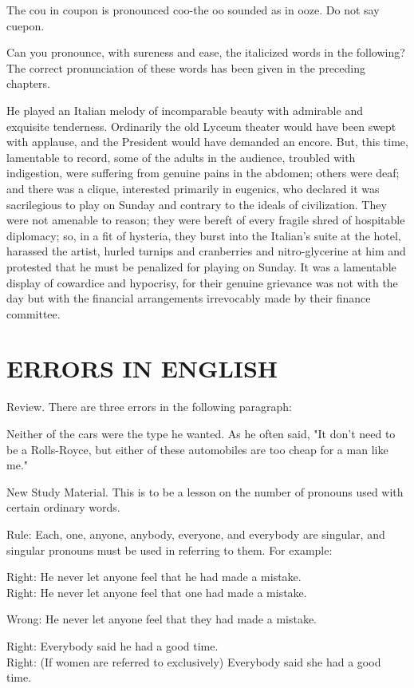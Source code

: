 \documentclass[10pt]{article}
\begin{document}
The cou in coupon is pronounced coo-the oo sounded as in ooze. Do not say cuepon.

Can you pronounce, with sureness and ease, the italicized words in the following? The correct pronunciation of these words has been given in the preceding chapters.

He played an Italian melody of incomparable beauty with admirable and exquisite tenderness. Ordinarily the old Lyceum theater would have been swept with applause, and the President would have demanded an encore. But, this time, lamentable to record, some of the adults in the audience, troubled with indigestion, were suffering from genuine pains in the abdomen; others were deaf; and there was a clique, interested primarily in eugenics, who declared it was sacrilegious to play on Sunday and contrary to the ideals of civilization. They were not amenable to reason; they were bereft of every fragile shred of hospitable diplomacy; so, in a fit of hysteria, they burst into the Italian's suite at the hotel, harassed the artist, hurled turnips and cranberries and nitro-glycerine at him and protested that he must be penalized for playing on Sunday. It was a lamentable display of cowardice and hypocrisy, for their genuine grievance was not with the day but with the financial arrangements irrevocably made by their finance committee.

\section*{ERRORS IN ENGLISH}
Review. There are three errors in the following paragraph:

Neither of the cars were the type he wanted. As he often said, "It don't need to be a Rolls-Royce, but either of these automobiles are too cheap for a man like me."

New Study Material. This is to be a lesson on the number of pronouns used with certain ordinary words.

Rule: Each, one, anyone, anybody, everyone, and everybody are singular, and singular pronouns must be used in referring to them. For example:

Right: He never let anyone feel that he had made a mistake.\\
Right: He never let anyone feel that one had made a mistake.

Wrong: He never let anyone feel that they had made a mistake.

Right: Everybody said he had a good time.\\
Right: (If women are referred to exclusively) Everybody said she had a good time.
\end{document}
